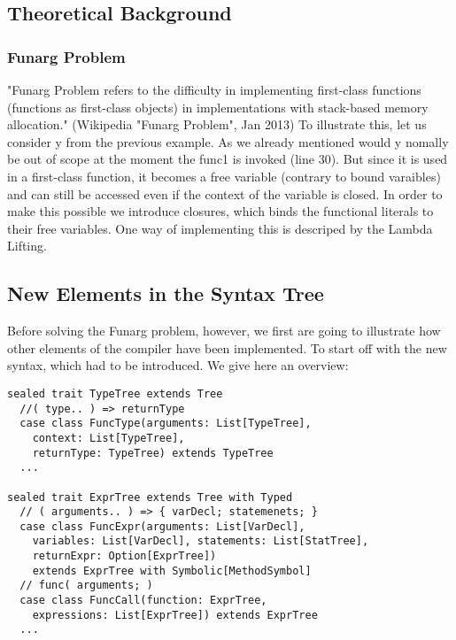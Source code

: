 \subsection{Theoretical Background}

\subsubsection{Funarg Problem}
"Funarg Problem refers to the difficulty in implementing first-class functions (functions as first-class objects) in implementations with stack-based memory allocation." (Wikipedia "Funarg Problem", Jan 2013) To illustrate this, let us consider y from the previous example. As we already mentioned would y nomally be out of scope at the moment the func1 is invoked (line 30). But since it is used in a first-class function, it becomes a free variable (contrary to bound varaibles) and can still be accessed even if the context of the variable is closed. In order to make this possible we introduce closures, which binds the functional literals to their free variables. One way of implementing this is descriped by the Lambda Lifting. \newline

\subsection{New Elements in the Syntax Tree}
Before solving the Funarg problem, however, we first are going to illustrate how other elements of the compiler have been implemented. To start off with the new syntax, which had to be introduced. We give here an overview:

\begin{lstlisting}
sealed trait TypeTree extends Tree
  //( type.. ) => returnType
  case class FuncType(arguments: List[TypeTree],
    context: List[TypeTree], 
    returnType: TypeTree) extends TypeTree
  ...

sealed trait ExprTree extends Tree with Typed
  // ( arguments.. ) => { varDecl; statemenets; }
  case class FuncExpr(arguments: List[VarDecl],
    variables: List[VarDecl], statements: List[StatTree],
    returnExpr: Option[ExprTree])
    extends ExprTree with Symbolic[MethodSymbol]
  // func( arguments; )
  case class FuncCall(function: ExprTree,
    expressions: List[ExprTree]) extends ExprTree
  ...
\end{lstlisting}



